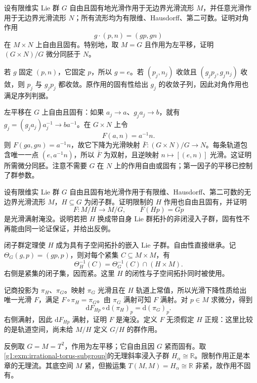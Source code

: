 \begin{exercise}\label{g1:ex:diagonal-proper-action}
	设有限维实 Lie 群 \(G\) 自由且固有地光滑作用于无边界光滑流形 \(M\)，并任意光滑作用于无边界光滑流形 \(N\)；所有流形均为有限维、Hausdorff、第二可数。证明对角作用
	\[
		g\cdot(p,n)=(gp,gn)
	\]
	在 \(M\times N\) 上自由且固有。特别地，取 \(M=G\) 且作用为左平移，证明 \((G\times N)/G\) 微分同胚于 \(N\)。
\end{exercise}
\begin{solution}
	若 \(g\) 固定 \((p,n)\)，它固定 \(p\)，所以 \(g=e\)。若 \((p_j,n_j)\) 收敛且 \((g_jp_j,g_jn_j)\) 收敛，则 \(p_j\) 与 \(g_jp_j\) 都收敛。原作用的固有性给出 \(g_j\) 的收敛子列，因此对角作用也满足序列判据。

	左平移在 \(G\) 上自由且固有：如果 \(a_j\to a\)、\(g_ja_j\to b\)，就有 \(g_j=(g_ja_j)a_j^{-1}\to ba^{-1}\)。在 \(G\times N\) 上令
	\[
		F(a,n)=a^{-1}n.
	\]
	则 \(F(ga,gn)=a^{-1}n\)，故它下降为光滑映射 \(\bar F:(G\times N)/G\to N\)。每条轨道包含唯一一点 \((e,a^{-1}n)\)，所以 \(\bar F\) 为双射，且逆映射 \(n\mapsto[(e,n)]\) 光滑。这证明所需微分同胚。注意不需要 \(G\) 在 \(N\) 上的作用自由或固有；第一因子的平移已控制了群参数。
\end{solution}

\begin{exercise}\label{g1:ex:closed-subgroup-action-quotients}
	设有限维实 Lie 群 \(G\) 自由且固有地光滑作用于有限维、Hausdorff、第二可数的无边界光滑流形 \(M\)，\(H\subseteq G\) 为闭子群。证明限制的 \(H\) 作用也自由且固有，并证明
	\[
		F:M/H\longrightarrow M/G,\qquad F(Hp)=Gp
	\]
	是光滑满射淹没。说明若把 \(H\) 换成带自身 Lie 群拓扑的非闭浸入子群，固有性不再能由同一论证保证，并给出反例。
\end{exercise}
\begin{solution}
	闭子群定理使 \(H\) 成为具有子空间拓扑的嵌入 Lie 子群。自由性直接继承。记 \(\Theta_G(g,p)=(gp,p)\)，则对每个紧集 \(C\subseteq M\times M\)，有
	\[
		\Theta_H^{-1}(C)=\Theta_G^{-1}(C)\cap(H\times M).
	\]
	右侧是紧集的闭子集，因而紧。这里 \(H\) 的闭性与子空间拓扑同时被使用。

	记商投影为 \(\pi_H\)、\(\pi_G\)。映射 \(\pi_G\) 光滑且在 \(H\) 轨道上常值，所以光滑下降性质给出唯一光滑 \(F\)，满足 \(F\circ\pi_H=\pi_G\)。由 \(\pi_G\) 满射可知 \(F\) 满射。对 \(p\in M\) 求微分，得到
	\[
		\mathrm{d}F_{Hp}\circ\mathrm{d}(\pi_H)_p=\mathrm{d}(\pi_G)_p.
	\]
	右侧满射，因此 \(\mathrm{d}F_{Hp}\) 满射，证明 \(F\) 是淹没。定义 \(F\) 无须假定 \(H\) 正规：这里比较的是轨道空间，尚未给 \(M/H\) 定义 \(G/H\) 的群作用。

	反例取 \(G=M=T^2\)，作用为左平移；它自由且因 \(G\) 紧而固有。取\cref{g1:exm:irrational-torus-subgroup}的无理斜率浸入子群 \(H_\alpha\cong\mathbb R\)。限制作用正是本章的无理流。其底空间 \(M\) 紧，但搬运集 \(T(M,M)=H_\alpha\cong\mathbb R\) 非紧，故作用不固有。
\end{solution}

